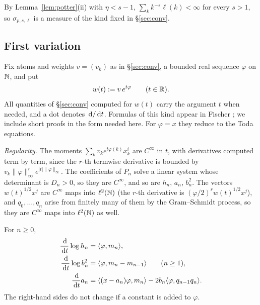 By Lemma~\ref{lem:potter}(ii) with $\eta<s-1$, $\sum_kk^{-s}\ell(k)<\infty$ for every $s>1$, so $\sigma_{p,s,\ell}$
is a measure of the kind fixed in \S\ref{sec:conv}.

\subsection{First variation}\label{sec:fv}
Fix atoms and weights $v=(v_k)$ as in \S\ref{sec:conv}, a bounded real sequence $\varphi$ on $\mathbb{N}$, and put
\[
  w(t):=v\,e^{t\varphi}\qquad(t\in\mathbb{R}).
\]
All quantities of \S\ref{sec:conv} computed for $w(t)$ carry the argument $t$ when needed, and a dot denotes
$\,\mathrm{d}/\,\mathrm{d} t$. Formulas of this kind appear in Fischer \cite[Lemma~4]{Fischer}; we include short proofs in the form
needed here. For $\varphi=x$ they reduce to the Toda equations.

\emph{Regularity.} The moments $\sum_kv_ke^{t\varphi(k)}x_k^i$ are $C^\infty$ in $t$, with derivatives computed term
by term, since the $r$-th termwise derivative is bounded by $v_k\|\varphi\|_\infty^re^{|t|\|\varphi\|_\infty}$. The
coefficients of $P_n$ solve a linear system whose determinant is $D_n>0$, so they are $C^\infty$, and so are $h_n$,
$a_n$, $b_n^2$. The vectors $w(t)^{1/2}x^j$ are $C^\infty$ maps into $\ell^2(\mathbb{N})$ (the $r$-th derivative is
$(\varphi/2)^rw(t)^{1/2}x^j$), and $q_0,\dots,q_n$ arise from finitely many of them by the Gram--Schmidt process, so
they are $C^\infty$ maps into $\ell^2(\mathbb{N})$ as well.

\begin{lemma}\label{lem:fv}
For $n\ge0$,
\begin{align}
  \frac{\,\mathrm{d}}{\,\mathrm{d} t}\log h_n&=\langle\varphi,m_n\rangle, \label{eq:fv-h}\\
  \frac{\,\mathrm{d}}{\,\mathrm{d} t}\log b_n^2&=\langle\varphi,m_n-m_{n-1}\rangle\qquad(n\ge1), \label{eq:fv-b}\\
  \frac{\,\mathrm{d}}{\,\mathrm{d} t}a_n&=\langle(x-a_n)\varphi,m_n\rangle-2b_n\langle\varphi,q_{n-1}q_n\rangle. \label{eq:fv-a}
\end{align}
The right-hand sides do not change if a constant is added to $\varphi$.
\end{lemma}

